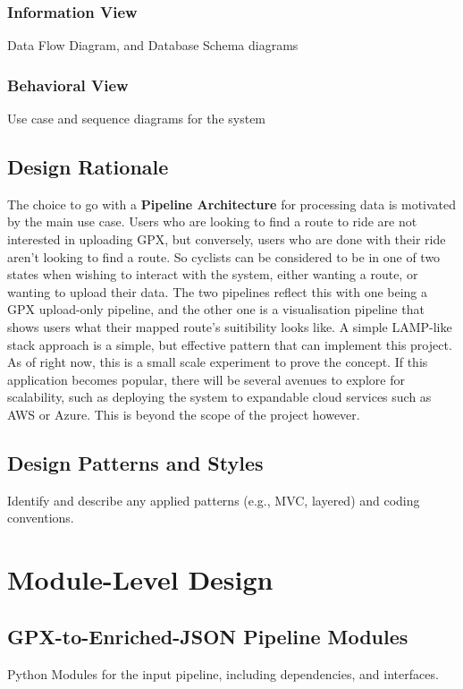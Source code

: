 \documentclass[11pt,twoside]{report}
\begin{document}
\subsubsection{Information View}
Data Flow Diagram, and Database Schema diagrams
\subsubsection{Behavioral View}
Use case and sequence diagrams for the system

\subsection{Design Rationale}
The choice to go with a \textbf{Pipeline Architecture} for processing data is motivated by the main use case. Users who are looking
to find a route to ride are not interested in uploading GPX, but conversely, users who are done with their ride aren't looking to
find a route. So cyclists can be considered to be in one of two states when wishing to interact with the system, either wanting a route,
or wanting to upload their data. The two pipelines reflect this with one being a GPX upload-only pipeline, and the other one is a visualisation
pipeline that shows users what their mapped route's suitibility looks like.
A simple LAMP-like stack approach is a simple, but effective pattern that can implement this project. As of right now, this is a small scale
experiment to prove the concept. If this application becomes popular, there will be several avenues to explore for scalability, such as deploying the
system to expandable cloud services such as AWS or Azure. This is beyond the scope of the project however.

\subsection{Design Patterns and Styles}
Identify and describe any applied patterns (e.g., MVC, layered) and coding conventions.

\section{Module-Level Design}
\label{sec:moduledesign}
\subsection{GPX-to-Enriched-JSON Pipeline Modules}
Python Modules for the input pipeline, including dependencies, and interfaces.
\end{document}
